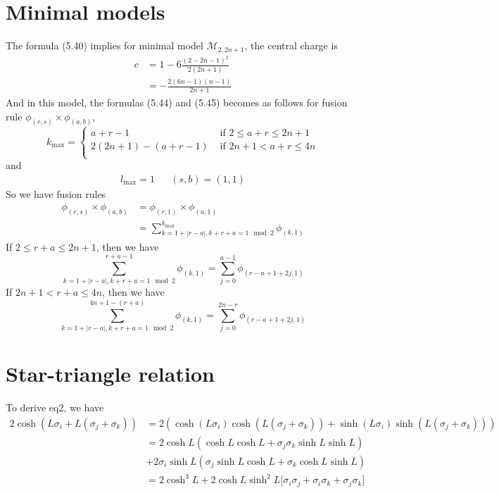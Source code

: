 \section{Minimal models}
The formula (5.40) implies for minimal model $\mathcal{M}_{2,2n+1}$, the central charge is 
\[
\begin{aligned}
c & = 1 - 6 \frac{(2-2n-1)^2}{2(2n+1)}\\
& =  - \frac{2(6n-1)(n-1)}{2n+1}
\end{aligned}
\]
And in this model, the formulas (5.44) and (5.45) becomes as follows for fusion rule $\phi_{(r,s)} \times \phi_{(a,b)}$,
\[
k_{\text{max}} = \begin{cases}
a+r -1 & \text{ if } 2 \leq a+r \leq 2n+1\\
2(2n+1) -(a+r-1) & \text{ if } 2n+1 < a+r \leq 4n\\
\end{cases}
\]
and 
\[
\begin{aligned}
l_{\text{max}} = 1& &(s,b)=(1,1)
\end{aligned}
\]
So we have fusion rules
\[
\begin{aligned}
 \phi_{(r,s)} \times \phi_{(a,b)} & = \phi_{(r,1)} \times \phi_{(a,1)} \\
 & = \sum_{k=1+|r-a|,k+r+a =1 \mod 2}^{k_{\text{max}}} \phi_{(k,1)}
\end{aligned}
\]
If $2 \leq r+a \leq 2n+1$, then we have
\[
\sum_{k=1+|r-a|,k+r+a =1 \mod 2}^{r+a-1} \phi_{(k,1)} = \sum_{j=0}^{a-1} \phi_{(r-a+1 + 2j,1)}
\]
If $2n+1 < r+a \leq 4n$, then we have 
\[
\sum_{k=1+|r-a|,k+r+a =1 \mod 2}^{4n+1-(r+a)} \phi_{(k,1)} = \sum_{j=0}^{2n-r} \phi_{(r-a+1 + 2j,1)}
\]
\section{Star-triangle relation}
To derive eq2, we have 
\[
\begin{aligned}
2 \cosh(L \sigma_i + L(\sigma_j + \sigma_k)) & = 2(\cosh(L\sigma_i)\cosh(L(\sigma_j + \sigma_k)) + \sinh(L\sigma_i) \sinh(L(\sigma_j + \sigma_k)) )\\
& = 2\cosh L (\cosh L \cosh L + \sigma_j\sigma_k \sinh L \sinh L) \\
&+ 2\sigma_i \sinh L (\sigma_j\sinh L \cosh L + \sigma_k\cosh L \sinh L )\\
& = 2\cosh^3 L + 2\cosh L \sinh^2 L \Big\lbrack \sigma_i \sigma_j + \sigma_i \sigma_k + \sigma_j \sigma_k \Big \rbrack
\end{aligned}
\]